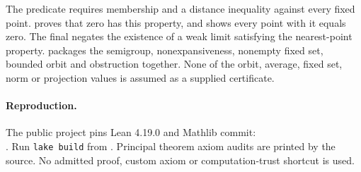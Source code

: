 \documentclass[11pt]{article}
\begin{document}
The predicate  requires membership and a distance inequality against every fixed point.  proves that zero has this property, and  shows every point with it equals zero. The final  negates the existence of a weak limit satisfying the nearest-point property.  packages the semigroup, nonexpansiveness, nonempty fixed set, bounded orbit and obstruction together. None of the orbit, average, fixed set, norm or projection values is assumed as a supplied certificate.

\paragraph{Reproduction.}
The public project pins Lean 4.19.0 and Mathlib commit:\\
.
Run \texttt{lake build} from . Principal theorem axiom audits are printed by the source. No admitted proof, custom axiom or computation-trust shortcut is used.
\end{document}
